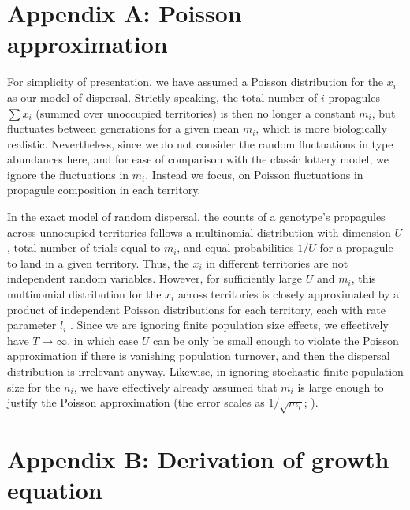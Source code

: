\documentclass[11pt]{article}
\begin{document}


 

\section*{Appendix A: Poisson approximation}

For simplicity of presentation, we have assumed a Poisson distribution for the $x_i$ as our model of dispersal. Strictly speaking, the total number of $i$ propagules $\sum x_i$ (summed over unoccupied territories) is then no longer a constant $m_i$, but fluctuates between generations for a given mean $m_i$, which is more biologically realistic. Nevertheless, since we do not consider the random fluctuations in type abundances here, and for ease of comparison with the classic lottery model, we ignore the fluctuations in $m_i$. Instead we focus, on Poisson fluctuations in propagule composition in each territory. 

In the exact model of random dispersal, the counts of a genotype's propagules across unnocupied territories follows a multinomial distribution with dimension $U$, total number of trials equal to $m_i$, and equal probabilities $1/U$ for a propagule to land in a given territory. Thus, the $x_i$ in different territories are not independent random variables. However, for sufficiently large $U$ and $m_i$, this multinomial distribution for the $x_i$ across territories is closely approximated by a product of independent Poisson distributions for each territory, each with rate parameter $l_i$ \citep[Theorem 1]{arenbaev_1977}. Since we are ignoring finite population size effects, we effectively have $T\rightarrow \infty$, in which case $U$ can be only be small enough to violate the Poisson approximation if there is vanishing population turnover, and then the dispersal distribution is irrelevant anyway. Likewise, in ignoring stochastic finite population size for the $n_i$, we have effectively already assumed that $m_i$ is large enough to justify the Poisson approximation (the error scales as $1/\sqrt{m_i}$; \citealt{arenbaev_1977}).

\section*{Appendix B: Derivation of growth equation}
\end{document}
